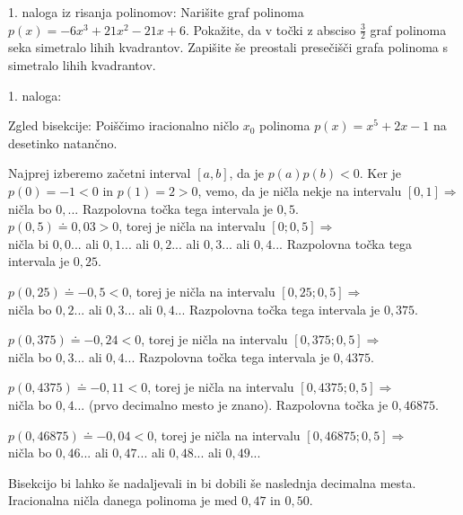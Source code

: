 \begin{vaja}
1. naloga iz risanja polinomov:
Narišite graf polinoma $p(x)=-6x^3+21x^2-21x+6$. Pokažite, da v točki z absciso $\frac{3}{2}$ graf polinoma 
seka simetralo lihih kvadrantov. Zapišite še preostali presečišči grafa polinoma s simetralo lihih kvadrantov.



  \begin{odgovor}
1. naloga: %

  \end{odgovor}

\end{vaja}



\begin{vaja}

Zgled bisekcije:
Poiščimo iracionalno ničlo $x_0$ polinoma $p(x)=x^5+2x-1$ na desetinko natančno.

Najprej izberemo začetni interval $[a,b]$, da je $p(a)p(b)<0$. Ker je $p(0)=-1<0$ in $p(1)=2>0$, 
vemo, da je ničla nekje na intervalu $[0,1] \Rightarrow$ \\
ničla bo $0,...$ Razpolovna točka tega intervala je $0,5$. \\
$p(0,5)\doteq 0,03>0$, torej je ničla na intervalu $[0;0,5] \Rightarrow$ \\

ničla bi $0,0...$ ali $0,1...$ ali $0,2...$ ali $0,3...$ ali $0,4...$ Razpolovna točka tega intervala je $0,25$.

$p(0,25)\doteq-0,5<0$, torej je ničla na intervalu $[0,25;0,5] \Rightarrow$ \\
ničla bo $0,2...$ ali $0,3...$ ali $0,4...$ Razpolovna točka tega intervala je $0,375$.

$p(0,375)\doteq -0,24<0$, torej je ničla na intervalu $[0,375;0,5] \Rightarrow$ \\
ničla bo $0,3...$ ali $0,4...$ Razpolovna točka tega intervala je $0,4375$.

$p(0,4375)\doteq -0,11<0$, torej je ničla na intervalu $[0,4375;0,5] \Rightarrow$ \\
ničla bo $0,4...$ (prvo decimalno mesto je znano). Razpolovna točka je $0,46875$.

$p(0,46875)\doteq -0,04<0$, torej je ničla na intervalu $[0,46875;0,5] \Rightarrow$ \\
ničla bo $0,46...$ ali $0,47...$ ali $0,48...$ ali $0,49$...

Bisekcijo bi lahko še nadaljevali in bi dobili še naslednja decimalna mesta.
Iracionalna ničla danega polinoma je med $0,47$ in $0,50$.



\end{vaja}


